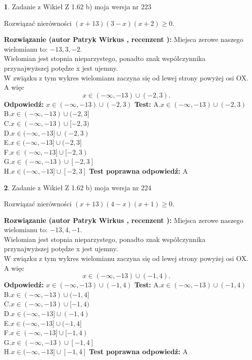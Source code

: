 \documentclass[12pt, a4paper]{article}
\theoremstyle{definition} %
\newtheorem{zad}{}
\newcommand{\zadStart}[1]{\begin{zad}#1\newline}
\newcommand{\zadStop}{\end{zad}}
\newcommand{\rozwStart}[2]{\noindent \textbf{Rozwiązanie (autor #1 , recenzent #2): }\newline}
\newcommand{\rozwStop}{\newline}
\newcommand{\odpStart}{\noindent \textbf{Odpowiedź:}\newline}
\newcommand{\odpStop}{\newline}
\newcommand{\testStart}{\noindent \textbf{Test:}\newline}
\newcommand{\testStop}{\newline}
\newcommand{\kluczStart}{\noindent \textbf{Test poprawna odpowiedź:}\newline}
\newcommand{\kluczStop}{\newline}
\begin{document}
\zadStart{Zadanie z Wikieł Z 1.62 b) moja wersja nr 223}

Rozwiązać nierówności $(x+13)(3-x)(x+2)\ge0$.
\zadStop
\rozwStart{Patryk Wirkus}{}
Miejsca zerowe naszego wielomianu to: $-13, 3, -2$.\\
Wielomian jest stopnia nieparzystego, ponadto znak współczynnika przy\linebreak najwyższej potędze x jest ujemny.\\ W związku z tym wykres wielomianu zaczyna się od lewej strony powyżej osi OX. A więc $$x \in (-\infty,-13) \cup (-2,3).$$
\rozwStop
\odpStart
$x \in (-\infty,-13) \cup (-2,3)$
\odpStop
\testStart
A.$x \in (-\infty,-13) \cup (-2,3)$\\
B.$x \in (-\infty,-13) \cup (-2,3]$\\
C.$x \in (-\infty,-13) \cup [-2,3)$\\
D.$x \in (-\infty,-13] \cup (-2,3)$\\
E.$x \in (-\infty,-13] \cup (-2,3]$\\
F.$x \in (-\infty,-13] \cup [-2,3)$\\
G.$x \in (-\infty,-13) \cup [-2,3]$\\
H.$x \in (-\infty,-13] \cup [-2,3]$
\testStop
\kluczStart
A
\kluczStop



\zadStart{Zadanie z Wikieł Z 1.62 b) moja wersja nr 224}

Rozwiązać nierówności $(x+13)(4-x)(x+1)\ge0$.
\zadStop
\rozwStart{Patryk Wirkus}{}
Miejsca zerowe naszego wielomianu to: $-13, 4, -1$.\\
Wielomian jest stopnia nieparzystego, ponadto znak współczynnika przy\linebreak najwyższej potędze x jest ujemny.\\ W związku z tym wykres wielomianu zaczyna się od lewej strony powyżej osi OX. A więc $$x \in (-\infty,-13) \cup (-1,4).$$
\rozwStop
\odpStart
$x \in (-\infty,-13) \cup (-1,4)$
\odpStop
\testStart
A.$x \in (-\infty,-13) \cup (-1,4)$\\
B.$x \in (-\infty,-13) \cup (-1,4]$\\
C.$x \in (-\infty,-13) \cup [-1,4)$\\
D.$x \in (-\infty,-13] \cup (-1,4)$\\
E.$x \in (-\infty,-13] \cup (-1,4]$\\
F.$x \in (-\infty,-13] \cup [-1,4)$\\
G.$x \in (-\infty,-13) \cup [-1,4]$\\
H.$x \in (-\infty,-13] \cup [-1,4]$
\testStop
\kluczStart
A
\kluczStop
\end{document}

